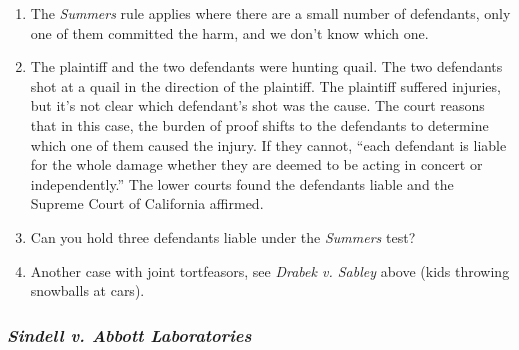 \begin{enumerate}
    \item The \emph{Summers} rule applies where there are a small number of defendants, only one of them committed the harm, and we don't know which one.
    \item The plaintiff and the two defendants were hunting quail. The two defendants shot at a quail in the direction of the plaintiff. The plaintiff suffered injuries, but it's not clear which defendant's shot was the cause. The court reasons that in this case, the burden of proof shifts to the defendants to determine which one of them caused the injury. If they cannot, ``each defendant is liable for the whole damage whether they are deemed to be acting in concert or independently.'' The lower courts found the defendants liable and the Supreme Court of California affirmed.
    \item Can you hold three defendants liable under the \emph{Summers} test?
    \item Another case with joint tortfeasors, see \emph{Drabek v. Sabley} above (kids throwing snowballs at cars).
\end{enumerate}

\subsubsection{\emph{Sindell v. Abbott Laboratories}}

